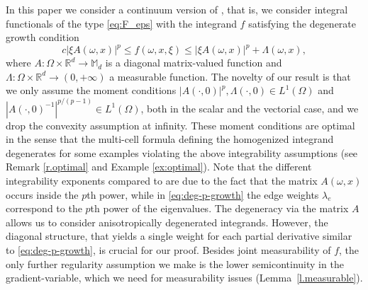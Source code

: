 \documentclass[10pt]{amsart}
\theoremstyle{definition}
\let\w\omega
\newcommand{\R}{\mathbb{R}}
\begin{document}
In this paper we consider a continuum version of \cite{NSS}, that is, we consider integral functionals of the type \eqref{eq:F_eps} with the integrand $f$ satisfying the degenerate growth condition\vspace*{-3pt}\enlargethispage{.5\baselineskip}%
\begin{equation}\label{eq:deg-growth}
c|\xi A(\w,x)|^p\leq f(\w,x,\xi)\leq |\xi A(\w,x)|^p+\Lambda(\w,x),
\end{equation}
where $A:\Omega\times\R^d\to \mathbb{M}_{d}$ is a diagonal matrix-valued function and $\Lambda:\Omega\times\R^d\to (0,+\infty)$ a measurable function. The novelty of our result is that we only assume the moment conditions $|A(\cdot,0)|^p,\Lambda(\cdot,0) \in L^1(\Omega)$ and $|A(\cdot,0)^{-1}|^{p/(p-1)}\in L^{1}(\Omega)$, both in the scalar and the vectorial case, and we drop the convexity assumption at infinity. These moment conditions are optimal in the sense that the multi-cell formula defining the homogenized integrand degenerates for some examples violating the above integrability assumptions (see Remark \ref{r.optimal} and Example \ref{ex:optimal}). Note that the different integrability exponents compared to \cite{NSS} are due to the fact that the matrix $A(\w,x)$ occurs inside the $p$th power, while in \eqref{eq:deg-p-growth} the edge weights $\lambda_e$ correspond to the $p$th power of the eigenvalues. The degeneracy via the matrix $A$ allows us to consider anisotropically degen\-er\-ated integrands. However, the diagonal structure, that yields a single weight for each partial derivative similar to \eqref{eq:deg-p-growth}, is crucial for our proof. Besides joint measurability of $f$, the only further regularity assumption we make is the lower semicontinuity in the gradient-variable, which we need for measurability issues (\cf Lemma~\ref{l.measurable}).
\end{document}
